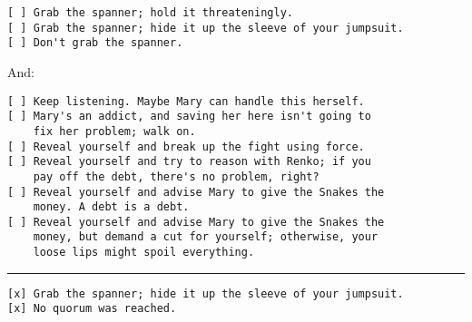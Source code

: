 \documentclass[a4paper,12pt]{book}
\newenvironment{commentary}%
	{
		\vfill%
		\hrule%
		\begin{footnotesize}%
		\color{MidnightBlue}%
	}%
	{%
		\end{footnotesize}%
	}
\begin{document}
\begin{verbatim}
[ ] Grab the spanner; hold it threateningly.
[ ] Grab the spanner; hide it up the sleeve of your jumpsuit.
[ ] Don't grab the spanner.
\end{verbatim}

And:

\newpage
\begin{small}
\begin{verbatim}
[ ] Keep listening. Maybe Mary can handle this herself.
[ ] Mary's an addict, and saving her here isn't going to
    fix her problem; walk on.
[ ] Reveal yourself and break up the fight using force.
[ ] Reveal yourself and try to reason with Renko; if you
    pay off the debt, there's no problem, right?
[ ] Reveal yourself and advise Mary to give the Snakes the
    money. A debt is a debt.
[ ] Reveal yourself and advise Mary to give the Snakes the
    money, but demand a cut for yourself; otherwise, your
    loose lips might spoil everything.
\end{verbatim}
\end{small}


\begin{commentary}
\begin{verbatim}
[x] Grab the spanner; hide it up the sleeve of your jumpsuit.
[x] No quorum was reached.
\end{verbatim}
\end{commentary}
\end{document}

